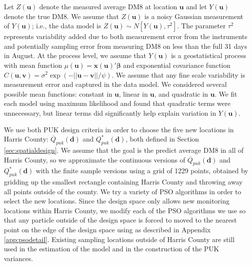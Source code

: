 \documentclass[cmbright]{staauth}
\begin{document}
Let $Z(\bm{u})$ denote the measured average DM8 at location $\bm{u}$ and let $Y(\bm{u})$ denote the true DM8. We assume that $Z(\bm{u})$ is a noisy Gaussian measurement of $Y(\bm{u})$; i.e., the data model is $Z(\bm{u}) \sim N[Y(\bm{u}), \tau^2]$. The parameter $\tau^2$ represents variability added due to both measurement error from the instruments and potentially sampling error from measuring DM8 on less than the full 31 days in August. At the process level, we assume that $Y(\bm{u})$ is a geostatistical process with mean function $\mu(\bm{u}) = \bm{x}(\bm{u})'\bm{\beta}$ and exponential covariance function $C(\bm{u},\bm{v}) = \sigma^2\exp(-||\bm{u} - \bm{v}||/\psi)$. We assume that any fine scale variability is measurement error and captured in the data model. We considered several possible mean functions: constant in $\bm{u}$, linear in $\bm{u}$, and quadratic in $\bm{u}$. We fit each model using maximum likelihood and found that quadratic terms were unnecessary, but linear terms did significantly help explain variation in $Y(\bm{u})$.

We use both PUK design criteria in order to choose the five new locations in Harris County: $\overline{Q}_{puk}(\bm{d})$ and $Q^*_{puk}(\bm{d})$, both defined in Section \ref{sec:spatialdesign}. We assume that the goal is the predict average DM8 in all of Harris County, so we approximate the continuous versions of $\overline{Q}_{puk}(\bm{d})$ and $Q^*_{puk}(\bm{d})$ with the finite sample versions using a grid of 1229 points, obtained by gridding up the smallest rectangle containing Harris County and throwing away all points outside of the county. We try a variety of PSO algorithms in order to select the new locations. Since the design space only allows new monitoring locations within Harris County, we modify each of the PSO algorithms we use so that any particle outside of the design space is forced to moved to the nearest point on the edge of the design space using as described in Appendix \ref{app:psodetail}. Existing sampling locations outside of Harris County are still used in the estimation of the model and in the construction of the PUK variances.
\end{document}
